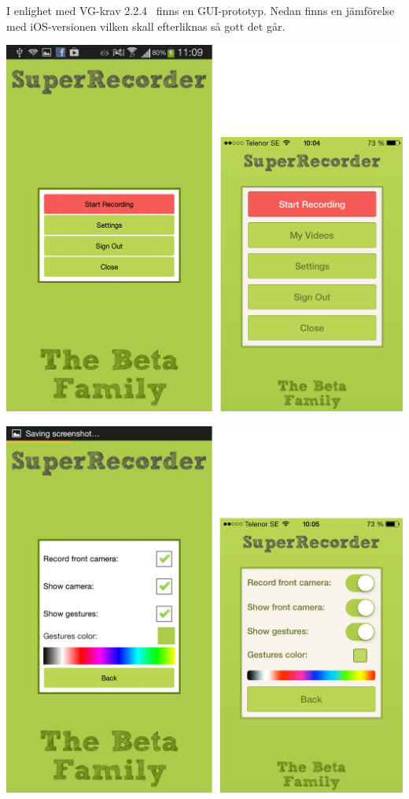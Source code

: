 I enlighet med VG-krav 2.2.4~\parencite{vgkrav} finns en GUI-prototyp. Nedan finns en jämförelse med iOS-versionen vilken skall efterliknas så gott det går.

\includegraphics[scale=0.5]{comp1.png}

\includegraphics[scale=0.5]{comp2.png}

